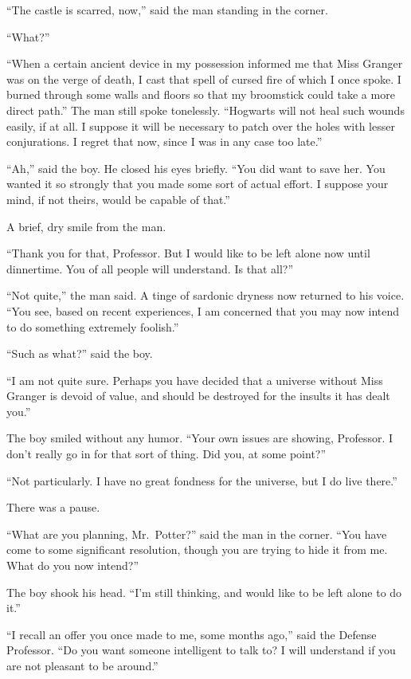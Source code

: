 ``The castle is scarred, now,'' said the man standing in the corner.

``What?''

``When a certain ancient device in my possession informed me that Miss
Granger was on the verge of death, I cast that spell of cursed fire of
which I once spoke. I burned through some walls and floors so that my
broomstick could take a more direct path.'' The man still spoke
tonelessly. ``Hogwarts will not heal such wounds easily, if at all. I
suppose it will be necessary to patch over the holes with lesser
conjurations. I regret that now, since I was in any case too late.''

``Ah,'' said the boy. He closed his eyes briefly. ``You did want to save
her. You wanted it so strongly that you made some sort of actual effort.
I suppose your mind, if not theirs, would be capable of that.''

A brief, dry smile from the man.

``Thank you for that, Professor. But I would like to be left alone now
until dinnertime. You of all people will understand. Is that all?''

``Not quite,'' the man said. A tinge of sardonic dryness now returned to
his voice. ``You see, based on recent experiences, I am concerned that
you may now intend to do something extremely foolish.''

``Such as what?'' said the boy.

``I am not quite sure. Perhaps you have decided that a universe without
Miss Granger is devoid of value, and should be destroyed for the insults
it has dealt you.''

The boy smiled without any humor. ``Your own issues are showing,
Professor. I don't really go in for that sort of thing. Did you, at some
point?''

``Not particularly. I have no great fondness for the universe, but I do
live there.''

There was a pause.

``What are you planning, Mr.~Potter?'' said the man in the corner. ``You
have come to some significant resolution, though you are trying to hide
it from me. What do you now intend?''

The boy shook his head. ``I'm still thinking, and would like to be left
alone to do it.''

``I recall an offer you once made to me, some months ago,'' said the
Defense Professor. ``Do you want someone intelligent to talk to? I will
understand if you are not pleasant to be around.''

